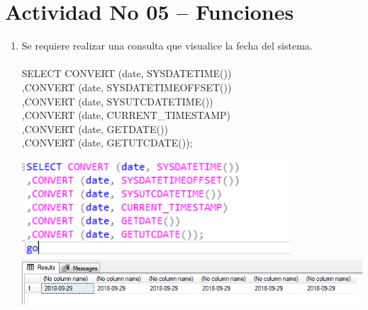 \section{Actividad No 05 – Funciones}
	
\begin{enumerate}[1.]
	\item Se requiere realizar una consulta que visualice la fecha del sistema.
	\\
	\\SELECT CONVERT (date, SYSDATETIME())
	\\,CONVERT (date, SYSDATETIMEOFFSET())
	\\,CONVERT (date, SYSUTCDATETIME())
	\\,CONVERT (date, CURRENT\_TIMESTAMP)
	\\,CONVERT (date, GETDATE())
    	\\,CONVERT (date, GETUTCDATE());
	\begin{center}
	\includegraphics[width=10cm]{./Imagenes/actividad_05_01a}
	\includegraphics[width=15cm]{./Imagenes/actividad_05_01}
	\end{center}
	

\end{enumerate}
